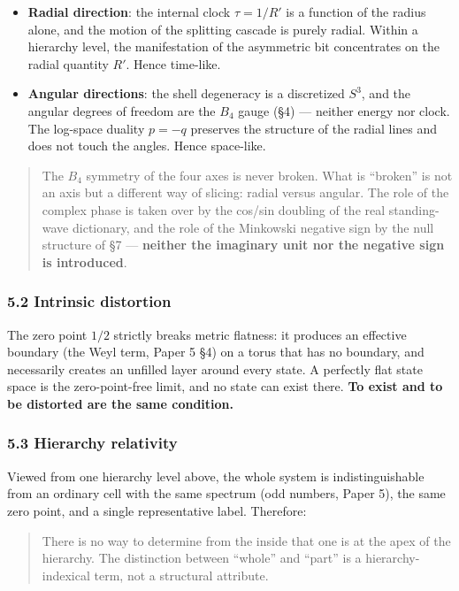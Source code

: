 \documentclass[
]{ltjsarticle}
\providecommand{\tightlist}{%
  \setlength{\itemsep}{0pt}\setlength{\parskip}{0pt}}
\begin{document}
\begin{itemize}
\tightlist
\item
  \textbf{Radial direction}: the internal clock \(\tau=1/R'\) is a
  function of the radius alone, and the motion of the splitting cascade
  is purely radial. Within a hierarchy level, the manifestation of the
  asymmetric bit concentrates on the radial quantity \(R'\). Hence
  time-like.
\item
  \textbf{Angular directions}: the shell degeneracy is a discretized
  \(S^3\), and the angular degrees of freedom are the \(B_4\) gauge (§4)
  --- neither energy nor clock. The log-space duality \(p=-q\) preserves
  the structure of the radial lines and does not touch the angles. Hence
  space-like.
\end{itemize}

\begin{quote}
The \(B_4\) symmetry of the four axes is never broken. What is
``broken'' is not an axis but a different way of slicing: radial versus
angular. The role of the complex phase is taken over by the cos/sin
doubling of the real standing-wave dictionary, and the role of the
Minkowski negative sign by the null structure of §7 --- \textbf{neither
the imaginary unit nor the negative sign is introduced}.
\end{quote}

\subsubsection{5.2 Intrinsic distortion}\label{intrinsic-distortion}

The zero point \(1/2\) strictly breaks metric flatness: it produces an
effective boundary (the Weyl term, Paper 5 §4) on a torus that has no
boundary, and necessarily creates an unfilled layer around every state.
A perfectly flat state space is the zero-point-free limit, and no state
can exist there. \textbf{To exist and to be distorted are the same
condition.}

\subsubsection{5.3 Hierarchy relativity}\label{hierarchy-relativity}

Viewed from one hierarchy level above, the whole system is
indistinguishable from an ordinary cell with the same spectrum (odd
numbers, Paper 5), the same zero point, and a single representative
label. Therefore:

\begin{quote}
There is no way to determine from the inside that one is at the apex of
the hierarchy. The distinction between ``whole'' and ``part'' is a
hierarchy-indexical term, not a structural attribute.
\end{quote}
\end{document}
